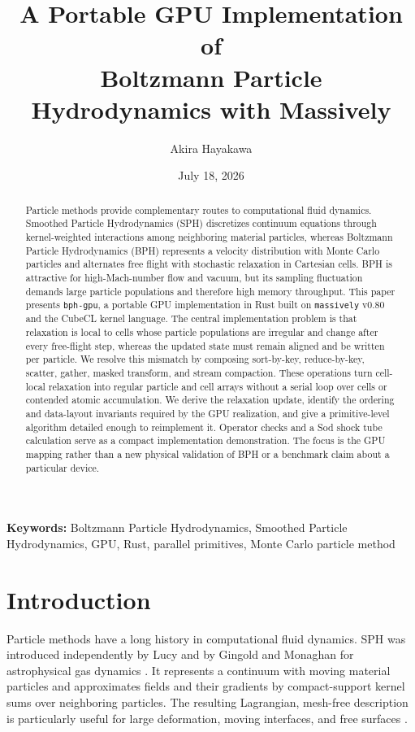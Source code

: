 \documentclass[a4paper,11pt]{article}
\title{A Portable GPU Implementation of\\
Boltzmann Particle Hydrodynamics with Massively}
\author{Akira Hayakawa}
\date{July 18, 2026}
\newcommand{\bphgpu}{\texttt{bph-gpu}\xspace}
\newcommand{\massively}{\texttt{massively}\xspace}
\newcommand{\cubecl}{CubeCL\xspace}
\begin{document}
\maketitle

\begin{abstract}
Particle methods provide complementary routes to computational fluid dynamics.
Smoothed Particle Hydrodynamics (SPH) discretizes continuum equations through
kernel-weighted interactions among neighboring material particles, whereas
Boltzmann Particle Hydrodynamics (BPH) represents a velocity distribution with
Monte Carlo particles and alternates free flight with stochastic relaxation in
Cartesian cells.  BPH is attractive for high-Mach-number flow and vacuum, but
its sampling fluctuation demands large particle populations and therefore high
memory throughput.  This paper presents \bphgpu, a portable GPU implementation
in Rust built on \massively v0.80 and the \cubecl kernel language.  The central
implementation problem is that relaxation is local to cells whose particle
populations are irregular and change after every free-flight step, whereas the
updated state must remain aligned and be written per particle.  We resolve this
mismatch by composing sort-by-key, reduce-by-key, scatter, gather, masked
transform, and stream compaction.  These operations turn cell-local relaxation
into regular particle and cell arrays without a serial loop over cells or
contended atomic accumulation.  We derive the relaxation update, identify the
ordering and data-layout invariants required by the GPU realization, and give a
primitive-level algorithm detailed enough to reimplement it.  Operator checks
and a Sod shock tube calculation serve as a compact implementation
demonstration.  The focus is the GPU mapping rather than a new physical
validation of BPH or a benchmark claim about a particular device.
\end{abstract}

\begin{center}
\small
\textbf{Keywords:} Boltzmann Particle Hydrodynamics, Smoothed Particle
Hydrodynamics, GPU, Rust, parallel primitives, Monte Carlo particle method
\end{center}

\section{Introduction}

Particle methods have a long history in computational fluid dynamics.  SPH was
introduced independently by Lucy and by Gingold and Monaghan for astrophysical
gas dynamics \cite{lucy1977,gingold1977}.  It represents a continuum with
moving material particles and approximates fields and their gradients by
compact-support kernel sums over neighboring particles.  The resulting
Lagrangian, mesh-free description is particularly useful for large deformation,
moving interfaces, and free surfaces \cite{monaghan1992}.
\end{document}
